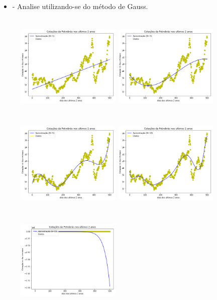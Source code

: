 \documentclass{article}
\begin{document}
\begin{itemize}
\item - Analise utilizando-se do método de Gauss.
\end{itemize}

\begin{figure}[!htb]
\includegraphics [width=5cm,height=5cm]{Gauss/G1.png}
\includegraphics [width=5cm,height=5cm]{Gauss/G3.png}
\includegraphics [width=5cm,height=5cm]{Gauss/G5.png}
\includegraphics [width=5cm,height=5cm]{Gauss/G10.png}
\includegraphics [width=5cm,height=5cm]{Gauss/G15.png}

\end{figure}
\end{document}
